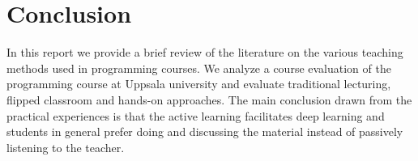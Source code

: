\documentclass{article}
\begin{document}





\section{Conclusion} %
\label{sec:conclusion}


In this report we provide a brief review of the literature on the various teaching methods used in programming courses. 
We analyze a course evaluation of the programming course at Uppsala university and evaluate traditional lecturing, flipped classroom and hands-on approaches. The main conclusion drawn from the practical experiences is that the active learning facilitates deep learning and students in general prefer doing and discussing the material instead of passively listening to the teacher.



\end{document}
